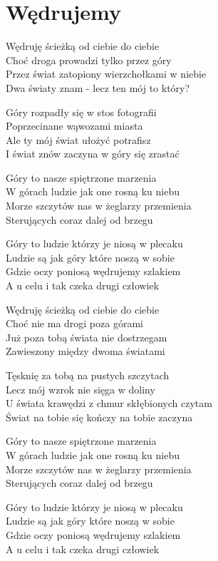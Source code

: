 \section{Wędrujemy}
\begin{text}
Wędruję ścieżką od ciebie do ciebie\\
Choć droga prowadzi tylko przez góry\\
Przez świat zatopiony wierzchołkami w niebie\\
Dwa światy znam - lecz ten mój to który?

Góry rozpadły się w stos fotografii\\
Poprzecinane wąwozami miasta\\
Ale ty mój świat ułożyć potrafisz\\
I świat znów zaczyna w góry się zrastać

Góry to nasze spiętrzone marzenia\\
W górach ludzie jak one rosną ku niebu\\
Morze szczytów nas w żeglarzy przemienia\\
Sterujących coraz dalej od brzegu

Góry to ludzie którzy je niosą w plecaku\\
Ludzie są jak góry które noszą w sobie\\
Gdzie oczy poniosą wędrujemy szlakiem\\
A u celu i tak czeka drugi człowiek

Wędruję ścieżką od ciebie do ciebie\\
Choć nie ma drogi poza górami\\
Już poza tobą świata nie dostrzegam\\
Zawieszony między dwoma światami

Tęsknię za tobą na pustych szczytach\\
Lecz mój wzrok nie sięga w doliny\\
U świata krawędzi z chmur skłębionych czytam\\
Świat na tobie się kończy na tobie zaczyna

Góry to nasze spiętrzone marzenia\\
W górach ludzie jak one rosną ku niebu\\
Morze szczytów nas w żeglarzy przemienia\\
Sterujących coraz dalej od brzegu

Góry to ludzie którzy je niosą w plecaku\\
Ludzie są jak góry które noszą w sobie\\
Gdzie oczy poniosą wędrujemy szlakiem\\
A u celu i tak czeka drugi człowiek
\end{text}